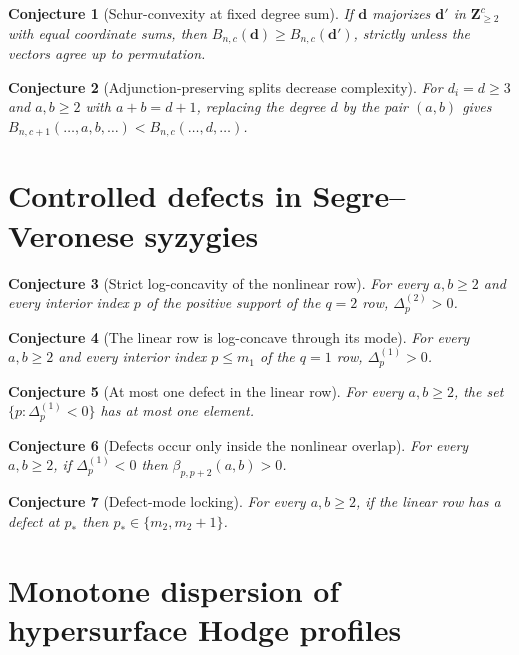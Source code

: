\documentclass[11pt]{article}
\newtheorem{conjecture}{Conjecture}
\theoremstyle{definition}
\begin{document}
\begin{conjecture}[Schur-convexity at fixed degree sum]\label{ae5}
If $\mathbf d$ majorizes $\mathbf d'$ in $\mathbf Z_{\ge2}^c$ with equal coordinate sums, then $B_{n,c}(\mathbf d)\ge B_{n,c}(\mathbf d')$, strictly unless the vectors agree up to permutation.
\end{conjecture}

\begin{conjecture}[Adjunction-preserving splits decrease complexity]\label{ae6}
For $d_i=d\ge3$ and $a,b\ge2$ with $a+b=d+1$, replacing the degree $d$ by the pair $(a,b)$ gives $B_{n,c+1}(\ldots,a,b,\ldots)<B_{n,c}(\ldots,d,\ldots)$.
\end{conjecture}

\section{Controlled defects in Segre--Veronese syzygies}

\begin{conjecture}[Strict log-concavity of the nonlinear row]\label{ae7}
For every $a,b\ge2$ and every interior index $p$ of the positive support of the $q=2$ row, $\Delta^{(2)}_p>0$.
\end{conjecture}

\begin{conjecture}[The linear row is log-concave through its mode]\label{ae8}
For every $a,b\ge2$ and every interior index $p\le m_1$ of the $q=1$ row, $\Delta^{(1)}_p>0$.
\end{conjecture}

\begin{conjecture}[At most one defect in the linear row]\label{ae9}
For every $a,b\ge2$, the set $\{p:\Delta^{(1)}_p<0\}$ has at most one element.
\end{conjecture}

\begin{conjecture}[Defects occur only inside the nonlinear overlap]\label{ae10}
For every $a,b\ge2$, if $\Delta^{(1)}_p<0$ then $\beta_{p,p+2}(a,b)>0$.
\end{conjecture}

\begin{conjecture}[Defect-mode locking]\label{ae11}
For every $a,b\ge2$, if the linear row has a defect at $p_{*}$ then $p_{*}\in\{m_2,m_2+1\}$.
\end{conjecture}

\section{Monotone dispersion of hypersurface Hodge profiles}
\end{document}
